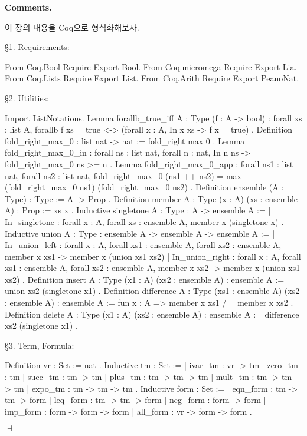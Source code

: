 \documentclass[12pt]{paper}
\newenvironment{context}[1][]
{ \noindent \textbf{{#1}.}
}
{ \hfill $ \dashv $
}
\begin{document}
  \begin{context}[Comments]
    이 장의 내용을 Coq으로 형식화해보자.

    \S1. Requirements:
    \begin{coqcode}
From Coq.Bool Require Export Bool.
From Coq.micromega Require Export Lia.
From Coq.Lists Require Export List.
From Coq.Arith Require Export PeanoNat.
    \end{coqcode}

    \S2. Utilities:
    \begin{coqcode}
Import ListNotations.
Lemma forallb_true_iff {A : Type} (f : A -> bool) :
  forall xs : list A,
  forallb f xs = true <-> (forall x : A, In x xs -> f x = true)
.
Definition fold_right_max_0 : list nat -> nat :=
  fold_right max 0
.
Lemma fold_right_max_0_in :
  forall ns : list nat,
  forall n : nat,
  In n ns ->
  fold_right_max_0 ns >= n
.
Lemma fold_right_max_0_app :
  forall ns1 : list nat,
  forall ns2 : list nat,
  fold_right_max_0 (ns1 ++ ns2) = max (fold_right_max_0 ns1) (fold_right_max_0 ns2)
.
Definition ensemble (A : Type) : Type :=
  A -> Prop
.
Definition member {A : Type} (x : A) (xs : ensemble A) : Prop :=
  xs x
.
Inductive singletone {A : Type} : A -> ensemble A :=
| In_singletone :
  forall x : A,
  forall xs : ensemble A,
  member x (singletone x)
.
Inductive union {A : Type} : ensemble A -> ensemble A -> ensemble A :=
| In_union_left :
  forall x : A,
  forall xs1 : ensemble A,
  forall xs2 : ensemble A,
  member x xs1 ->
  member x (union xs1 xs2)
| In_union_right :
  forall x : A,
  forall xs1 : ensemble A,
  forall xs2 : ensemble A,
  member x xs2 ->
  member x (union xs1 xs2)
.
Definition insert {A : Type} (x1 : A) (xs2 : ensemble A) : ensemble A :=
  union xs2 (singletone x1)
.
Definition difference {A : Type} (xs1 : ensemble A) (xs2 : ensemble A) : ensemble A :=
  fun x : A => member x xs1 /\ ~ member x xs2
.
Definition delete {A : Type} (x1 : A) (xs2 : ensemble A) : ensemble A :=
  difference xs2 (singletone x1)
.
    \end{coqcode}

    \S3. Term, Formula:
    \begin{coqcode}
Definition vr : Set :=
  nat
.
Inductive tm : Set :=
| ivar_tm : vr -> tm
| zero_tm : tm
| succ_tm : tm -> tm
| plus_tm : tm -> tm -> tm
| mult_tm : tm -> tm -> tm
| expo_tm : tm -> tm -> tm
.
Inductive form : Set :=
| eqn_form : tm -> tm -> form
| leq_form : tm -> tm -> form
| neg_form : form -> form
| imp_form : form -> form -> form
| all_form : vr -> form -> form
.
    \end{coqcode}


\end{context}
\end{document}
